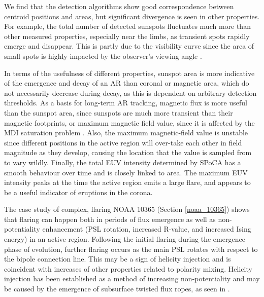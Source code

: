 We find that the detection algorithms show good correspondence between centroid positions and areas, but significant divergence is seen in other properties. For example, the total number of detected sunspots fluctuates much more than other measured properties, especially near the limbs, as transient spots rapidly emerge and disappear. This is partly due to the visibility curve since the area of small spots is highly impacted by the observer's viewing angle \citep{Dalla:2008,Watson:2009}.  

In terms of the usefulness of different properties, sunspot area is more indicative of the emergence and decay of an \gls{AR} than coronal or magnetic area, which do not necessarily decrease during decay, as this is dependent on arbitrary detection thresholds. As a basis for long-term \gls{AR} tracking, magnetic flux is more useful than the sunspot area, since sunspots are much more transient than their magnetic footprints, or maximum magnetic field value, since it is affected by the \gls{MDI} saturation problem \citep{Liu:2007}. Also, the maximum magnetic-field value is unstable since different positions in the active region will over-take each other in field magnitude as they develop, causing the location that the value is sampled from to vary wildly. Finally, the total \gls{EUV} intensity determined by \gls{SPoCA} has a smooth behaviour over time and is closely linked to area. The maximum \gls{EUV} intensity peaks at the time the active region emits a large flare, and appears to be a useful indicator of eruptions in the corona.

The case study of complex, flaring \gls{NOAA} 10365 (Section \ref{noaa_10365}) shows that flaring can happen both in periods of flux emergence as well as non-potentiality enhancement (PSL rotation, increased R-value, and increased Ising energy) in an active region. Following the initial flaring during the emergence phase of evolution, further flaring occurs as the main \gls{PSL} rotates with respect to the bipole connection line. This may be a sign of helicity injection and is coincident with increases of other properties related to polarity mixing. Helicity injection has been established as a method of increasing non-potentiality and may be caused by the emergence of subsurface twisted flux ropes, as seen in \citet{Dun:2007}.


